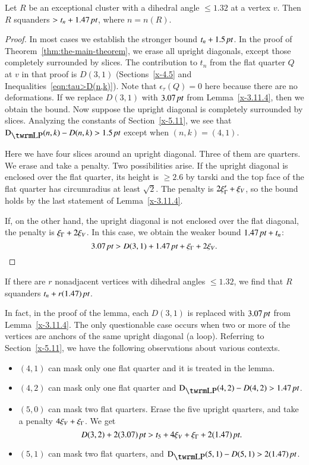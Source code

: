 \begin{lemma}
Let $R$ be an exceptional cluster with a dihedral angle
$\le1.32$ at a vertex $v$. Then $R$ squanders $>t_n+1.47\,\hbox{\it pt}$, where
$n=n(R)$.
\end{lemma}

\begin{proof}
In most cases we establish the stronger bound $t_n+1.5\,\hbox{\it pt}$. In the
proof of Theorem~\ref{thm:the-main-theorem}, we erase all upright
diagonals, except those completely surrounded by slices. The
contribution to $t_n$ from the flat quarter $Q$ at $v$ in that proof is
$D(3,1)$ (Sections~\ref{x-4.5} and Inequalities~\ref{eqn:tau>D(n,k)}).
Note that $\epsilon_\tau(Q)=0$ here because there are no deformations.
If we replace $D(3,1)$ with $3.07\,\hbox{\it pt}$ from Lemma~\ref{x-3.11.4}, then
we obtain the bound. Now suppose the upright diagonal is completely
surrounded by slices. Analyzing the constants of
Section~\ref{x-5.11}, we see that $\DLP(n,k)-D(n,k)>1.5\,\pt$ except
when $(n,k)=(4,1)$.

Here we have four slices around an upright diagonal. Three
of them are quarters.  We erase and take a penalty. Two possibilities
arise.  If the upright diagonal is enclosed over the flat quarter, its
height is $\ge2.6$ by tarski and the top face of the
flat quarter has circumradius at least $\sqrt2$.  The penalty is
$2\xi_\Gamma'+\xi_V$, so the bound holds by the last statement of
Lemma~\ref{x-3.11.4}.

If, on the other hand, the upright diagonal is not enclosed over the
flat diagonal, the penalty is $\xi_\Gamma+2\xi_V$.  In this case, we obtain the
weaker bound $1.47\,\hbox{\it pt}+t_n$:
    $$3.07\,\hbox{\it pt} > D(3,1) + 1.47\,\hbox{\it pt} +\xi_\Gamma+2\xi_V.$$
\end{proof}

\begin{remark} \label{remark:1.47}
If there are $r$ nonadjacent vertices with dihedral angles
$\le1.32$, we find that $R$ squanders $t_n+r(1.47)\,\hbox{\it pt}$.
\end{remark}

In fact, in the proof of the lemma, each $D(3,1)$ is replaced with
$3.07\,\hbox{\it pt}$ from Lemma~\ref{x-3.11.4}.  The only questionable case
occurs when two or more of the vertices are anchors of the same upright
diagonal (a loop). Referring to Section~\ref{x-5.11}, we have the
following observations about various contexts.

\begin{itemize}
    \item $(4,1)$ can mask only one flat quarter and it is treated in the
lemma.
    \item $(4,2)$ can mask only one flat quarter and
    $\DLP(4,2)-D(4,2)>1.47\,\pt$.
    \item $(5,0)$ can mask two flat quarters.  Erase the five upright quarters,
        and take a penalty $4\xi_V+\xi_\Gamma$.  We get
    $$D(3,2)+2(3.07)\,\hbox{\it pt} > t_5+4\xi_V+\xi_\Gamma+2(1.47)\,\hbox{\it pt}.$$
    \item $(5,1)$ can mask two flat quarters, and $\DLP(5,1)-D(5,1)>2(1.47)\,\pt$.
\end{itemize}




